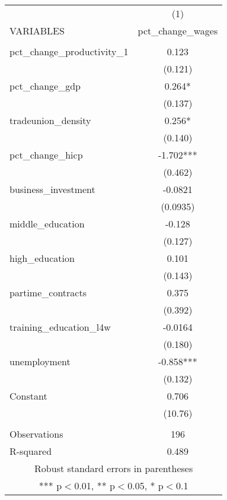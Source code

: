 \documentclass[]{article}
\begin{document}
\begin{tabular}{lc} \hline
 & (1) \\
VARIABLES & pct\_change\_wages \\ \hline
 &  \\
pct\_change\_productivity\_1 & 0.123 \\
 & (0.121) \\
pct\_change\_gdp & 0.264* \\
 & (0.137) \\
tradeunion\_density & 0.256* \\
 & (0.140) \\
pct\_change\_hicp & -1.702*** \\
 & (0.462) \\
business\_investment & -0.0821 \\
 & (0.0935) \\
middle\_education & -0.128 \\
 & (0.127) \\
high\_education & 0.101 \\
 & (0.143) \\
partime\_contracts & 0.375 \\
 & (0.392) \\
training\_education\_l4w & -0.0164 \\
 & (0.180) \\
unemployment & -0.858*** \\
 & (0.132) \\
Constant & 0.706 \\
 & (10.76) \\
 &  \\
Observations & 196 \\
 R-squared & 0.489 \\ \hline
\multicolumn{2}{c}{ Robust standard errors in parentheses} \\
\multicolumn{2}{c}{ *** p$<$0.01, ** p$<$0.05, * p$<$0.1} \\
\end{tabular}
\end{document}

